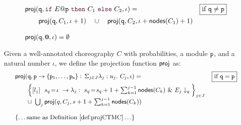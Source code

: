 \begin{definition}
\begin{displaymath}
\begin{array}{lr}
          \proj (\role q,\ifTE {E}{p}{C_1}{C_2}, \iota) = 
          &  \boxed{\text{if }\role q\neq\role p}\\[2mm]
          \qquad\proj (\role{q}, C_1, \iota+1)
          \quad\cup\quad
          \proj (\role{q}, C_2, \iota+\mathsf{nodes}(C_1)+1)

          \\\\

          \proj (\role q,\CEnd, \iota) = \emptyset

        \end{array}
      \end{displaymath}
    \end{definition}



    \begin{definition} Given a well-annotated
      choreography $C$ with probabilities, a module $\mathtt{p}$, and a
      natural number $\iota$, we define the projection function
      $\mathsf{proj}$ as:
      \begin{displaymath}\small
        \begin{array}{lr}

          \proj (\role q,\interact{p}{\role p_1,\ldots,\role p_n}, \iota)= 
          &  \boxed{\text{if }\role q=\role p}\\[2mm]
          \qquad
          \Big\{\commandBase {l_j} {\ s_{q}\!=\! \iota} {\lambda_j:\ s_{q}\!=\!
          s_{q} +1+\sum_{k=1}^{j-1}\mathsf{nodes}({C_k})}\ \&\ \projE
          {E_j}q\Big\}_{j\in J}
          \\
          \qquad\cup\ \bigcup_{j} \proj (q, C_j, s+1+\sum_{k=1}^{j-1}\mathsf{nodes}({C_k}))
          \\\\
          
          \{\ldots \text{same as Definition~\ref{def:projCTMC}}\ldots\}

        \end{array}
      \end{displaymath}
\end{definition}


       






